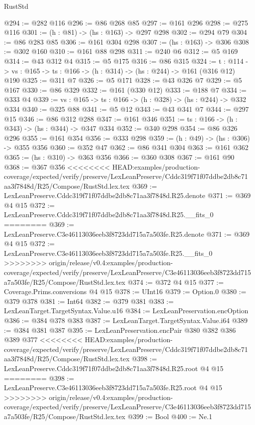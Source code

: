 \begin{lexlean}{RustStd}
\begin{coremodule}
{\begin{coremodule}
@294 := @282 @116
@296 := @86 @268 @85
@297 := @161 @296
@298 := @275 @116
@301 := (h : @81) -> (hs : @163) -> @297 @298
@302 := @294 @79
@304 := @86 @283 @85
@306 := @161 @304 @298
@307 := (hs : @163) -> @306
@308 := @302 @160
@310 := @161 @88 @298
@311 := @240 @6
@312 := @5 @169
@314 := @43 @312 @4
@315 := @5 @175
@316 := @86 @315
@324 := {t : @114} ->
  {vs : @165} -> {ts : @166} -> (h : @314) -> (hs : @244) -> @161 (@316 @12) @190
@325 := @311 @7
@326 := @5 @171
@328 := @43 @326 @7
@329 := @5 @167
@330 := @86 @329
@332 := @161 (@330 @12)
@333 := @188 @7
@334 := @333 @4
@339 := {vs : @165} -> {ts : @166} -> (h : @328) -> (hs : @244) -> @332 @334
@340 := @325 @88
@341 := @5 @12
@343 := @43 @341 @7
@344 := @297 @15
@346 := @86 @312 @288
@347 := @161 @346
@351 := {ts : @166} -> (h : @343) -> (hs : @344) -> @347 @334
@352 := @340 @298
@354 := @86 @326 @296
@355 := @161 @354
@356 := @333 @298
@359 := (h : @49) -> (hs : @306) -> @355 @356
@360 := @352 @47
@362 := @86 @341 @304
@363 := @161 @362
@365 := (hs : @310) -> @363 @356
@366 := @360 @308
@367 := @161 @90
@368 := @367 @356
<<<<<<<< HEAD:examples/production-coverage/expected/verify/preserve/LexLeanPreserve/Cddc319f71f07ddbe2db8c71aa3f7848d/R25/Compose/RustStd.lex.tex
@369 := LexLeanPreserve.Cddc319f71f07ddbe2db8c71aa3f7848d.R25.denote
@371 := @369 @4 @15
@372 := LexLeanPreserve.Cddc319f71f07ddbe2db8c71aa3f7848d.R25.__fits_0
========
@369 := LexLeanPreserve.C3e46113036eeb3f8723dd715a7a503fe.R25.denote
@371 := @369 @4 @15
@372 := LexLeanPreserve.C3e46113036eeb3f8723dd715a7a503fe.R25.__fits_0
>>>>>>>> origin/release/v0.4:examples/production-coverage/expected/verify/preserve/LexLeanPreserve/C3e46113036eeb3f8723dd715a7a503fe/R25/Compose/RustStd.lex.tex
@374 := @372 @4 @15
@377 := Coverage.Prims.conversions @4 @15
@378 := UInt16
@379 := Option.{0}
@380 := @379 @378
@381 := Int64
@382 := @379 @381
@383 := LexLeanTarget.TargetSyntax.Value.u16
@384 := LexLeanPreservation.encOption
@386 := @384 @378 @383
@387 := LexLeanTarget.TargetSyntax.Value.i64
@389 := @384 @381 @387
@395 := LexLeanPreservation.encPair @380 @382 @386 @389 @377
<<<<<<<< HEAD:examples/production-coverage/expected/verify/preserve/LexLeanPreserve/Cddc319f71f07ddbe2db8c71aa3f7848d/R25/Compose/RustStd.lex.tex
@398 := LexLeanPreserve.Cddc319f71f07ddbe2db8c71aa3f7848d.R25.root @4 @15
========
@398 := LexLeanPreserve.C3e46113036eeb3f8723dd715a7a503fe.R25.root @4 @15
>>>>>>>> origin/release/v0.4:examples/production-coverage/expected/verify/preserve/LexLeanPreserve/C3e46113036eeb3f8723dd715a7a503fe/R25/Compose/RustStd.lex.tex
@399 := Bool
@400 := Ne.{1}

\end{coremodule}}
\end{coremodule}
\end{lexlean}
